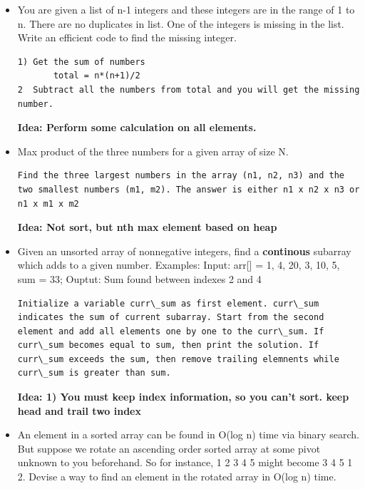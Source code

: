 \documentclass[a4paper,12pt,twoside]{book}
\begin{document}
\begin{itemize}
\item You are given a list of n-1 integers and these integers are in the range of 1 to n. There are no duplicates in list. One of the integers is missing in the list. Write an efficient code to find the missing integer.
\begin{lstlisting}[breaklines]
1) Get the sum of numbers 
       total = n*(n+1)/2
2  Subtract all the numbers from total and you will get the missing number.
\end{lstlisting}
\textbf{Idea: Perform some calculation on all elements. }

\item Max product of the three numbers for a given array of size N. 
\begin{lstlisting}[breaklines]
Find the three largest numbers in the array (n1, n2, n3) and the two smallest numbers (m1, m2). The answer is either n1 x n2 x n3 or n1 x m1 x m2
\end{lstlisting}
\textbf{Idea: Not sort, but nth max element based on heap}

\item Given an unsorted array of nonnegative integers, find a \textbf{continous} subarray which adds to a given number.  Examples: Input: arr[] = {1, 4, 20, 3, 10, 5}, sum = 33; Ouptut: Sum found between indexes 2 and 4
\begin{lstlisting}[breaklines]
Initialize a variable curr\_sum as first element. curr\_sum indicates the sum of current subarray. Start from the second element and add all elements one by one to the curr\_sum. If curr\_sum becomes equal to sum, then print the solution. If curr\_sum exceeds the sum, then remove trailing elemnents while curr\_sum is greater than sum.
\end{lstlisting}
\textbf{Idea: 1) You must keep index information, so you can't sort.  keep head and trail two index}

\item An element in a sorted array can be found in O(log n) time via binary search. But suppose we rotate an ascending order sorted array at some pivot unknown to you beforehand. So for instance, 1 2 3 4 5 might become 3 4 5 1 2. Devise a way to find an element in the rotated array in O(log n) time.
\begin{lstlisting}[breaklines]

\end{lstlisting}


\end{itemize}
\end{document}
